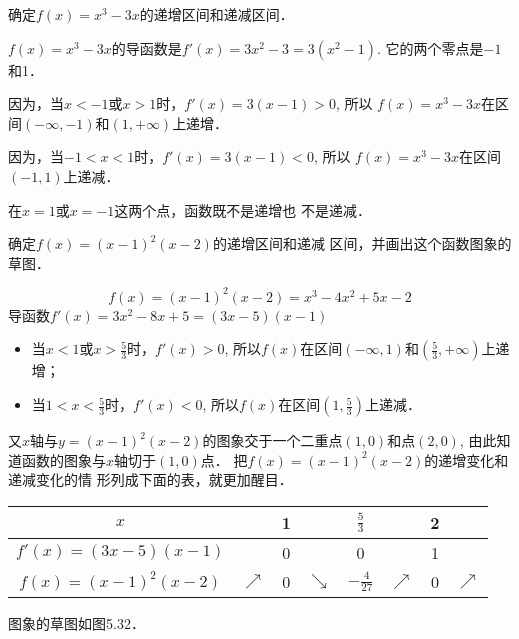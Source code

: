 \begin{example}
  确定$f(x)=x^3-3x$的递增区间和递减区间．  
\end{example}

\begin{solution}
$f(x)=x^3-3x$的导函数是$f'(x)=3x^2-3=3(x^2-
1)$. 它的两个零点是$-1$和1．

因为，当$x<-1$或$x>1$时，$f'(x)=3(x-1)>0$, 所以
$f(x)=x^3-3x$在区间$(-\infty,-1)$和$(1,+\infty)$上递增．

因为，当$-1<x<1$时，$f'(x)=3(x-1)<0$, 所以
$f(x)=x^3-3x$在区间$(-1,1)$上递减．
\end{solution}

\begin{rmk}
在$x=1$或$x=-1$这两个点，函数既不是递增也
不是递减．
\end{rmk}

\begin{example}
    确定$f(x)=(x-1)^2(x-2)$的递增区间和递减
区间，并画出这个函数图象的草图．
\end{example}

\begin{solution}
\[f(x)=(x-1)^2(x-2)=x^3-4x^2+5x-2\]
导函数$f'(x)=3x^2-8x+5=(3x-5)(x-1)$

\begin{itemize}
    \item 当$x<1$或$x>\frac{5}{3}$时，$f'(x)>0$, 所以$f(x)$在区间$(-\infty,1)$和$\left(\frac{5}{3},+\infty\right)$上递增；
    \item 当$1<x<\frac{5}{3}$时，$f'(x)<0$, 所以$f(x)$在区间$\left(1,\frac{5}{3}\right)$上递减．
\end{itemize}

又$x$轴与$y=(x-1)^2(x-2)$的图象交于一个二重点$(1,
0)$和点$(2,0)$, 由此知道函数的图象与$x$轴切于$(1,0)$点．
把$f(x)=(x-1)^2(x-2)$的递增变化和递减变化的情
形列成下面的表，就更加醒目．

\begin{center}
\begin{tabular}{c|ccccccc}
    \hline
$x$&&1&&$\tfrac{5}{3}$&&2\\
    \hline
$f'(x)=(3x-5)(x-1)$&&0&&0&&1\\
$f(x)=(x-1)^2(x-2)$&$\nearrow$&0&$\searrow$&$-\tfrac{4}{27}$&$\nearrow$&0&$\nearrow$\\
    \hline
\end{tabular}
\end{center}
图象的草图如图5.32．
\begin{figure}[htp]
    \centering
{}
    \caption{}
\end{figure}
\end{solution}


